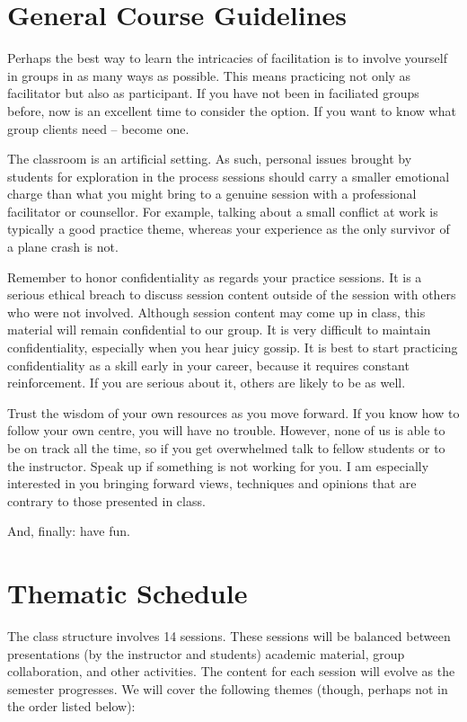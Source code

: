 \documentclass[letterpaper,10pt,headsepline]{scrreprt}
\begin{document}
\section{General Course Guidelines}
Perhaps the best way to learn the intricacies of facilitation is to involve yourself in groups in as many ways as possible. This means practicing not only as facilitator but also as participant. If you have not been in faciliated groups before, now is an excellent time to consider the option. If you want to know what group clients need -- become one.

The classroom is an artificial setting. As such, personal issues brought by students for exploration in the process sessions should carry a smaller emotional charge than what you might bring to a genuine session with a professional facilitator or counsellor. For example, talking about a small conflict at work is typically a good practice theme, whereas your experience as the only survivor of a plane crash is not.

Remember to honor confidentiality as regards your practice sessions. It is a serious ethical breach to discuss session content outside of the session with others who were not involved. Although session content may come up in class, this material will remain confidential to our group. It is very difficult to maintain confidentiality, especially when you hear juicy gossip. It is best to start practicing confidentiality as a skill early in your career, because it requires constant reinforcement. If you are serious about it, others are likely to be as well.

Trust the wisdom of your own resources as you move forward. If you know how to follow your own centre, you will have no trouble. However, none of us is able to be on track all the time, so if you get overwhelmed talk to fellow students or to the instructor. Speak up if something is not working for you. I am especially interested in you bringing forward views, techniques and opinions that are contrary to those presented in class.

And, finally: have fun.

\section{Thematic Schedule}
The class structure involves 14 sessions. These sessions will be
balanced between presentations (by the instructor and students)
academic material, group collaboration, and other activities. The content for each session will evolve as the semester progresses. We will cover the following themes (though, perhaps not in the order listed below):
\\
\end{document}
